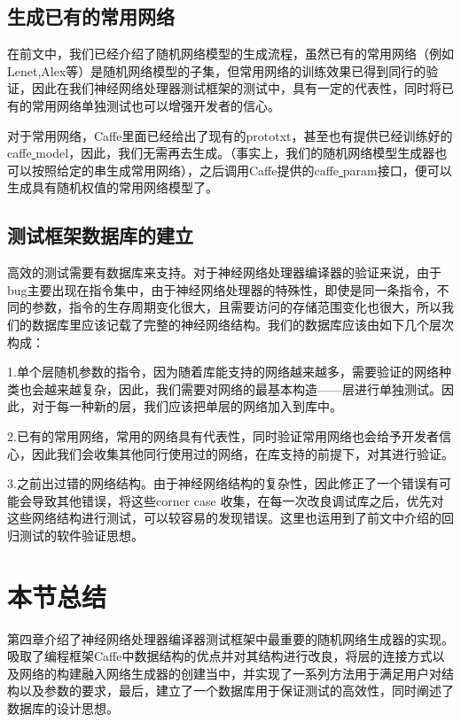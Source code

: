 \subsection{生成已有的常用网络}
在前文中，我们已经介绍了随机网络模型的生成流程，虽然已有的常用网络（例如Lenet,Alex等）是随机网络模型的子集，但常用网络的训练效果已得到同行的验证，因此在我们神经网络处理器测试框架的测试中，具有一定的代表性，同时将已有的常用网络单独测试也可以增强开发者的信心。

对于常用网络，Caffe里面已经给出了现有的prototxt，甚至也有提供已经训练好的caffe\underline{ }model，因此，我们无需再去生成。（事实上，我们的随机网络模型生成器也可以按照给定的串生成常用网络），之后调用Caffe提供的caffe\underline{ }param接口，便可以生成具有随机权值的常用网络模型了。

\subsection{测试框架数据库的建立}
高效的测试需要有数据库来支持。对于神经网络处理器编译器的验证来说，由于bug主要出现在指令集中，由于神经网络处理器的特殊性，即使是同一条指令，不同的参数，指令的生存周期变化很大，且需要访问的存储范围变化也很大，所以我们的数据库里应该记载了完整的神经网络结构。我们的数据库应该由如下几个层次构成：

1.单个层随机参数的指令，因为随着库能支持的网络越来越多，需要验证的网络种类也会越来越复杂，因此，我们需要对网络的最基本构造——层进行单独测试。因此，对于每一种新的层，我们应该把单层的网络加入到库中。

2.已有的常用网络，常用的网络具有代表性，同时验证常用网络也会给予开发者信心，因此我们会收集其他同行使用过的网络，在库支持的前提下，对其进行验证。

3.之前出过错的网络结构。由于神经网络结构的复杂性，因此修正了一个错误有可能会导致其他错误，将这些corner case 收集，在每一次改良调试库之后，优先对这些网络结构进行测试，可以较容易的发现错误。这里也运用到了前文中介绍的回归测试的软件验证思想。
\section{本节总结}
第四章介绍了神经网络处理器编译器测试框架中最重要的随机网络生成器的实现。吸取了编程框架Caffe中数据结构的优点并对其结构进行改良，将层的连接方式以及网络的构建融入网络生成器的创建当中，并实现了一系列方法用于满足用户对结构以及参数的要求，最后，建立了一个数据库用于保证测试的高效性，同时阐述了数据库的设计思想。
